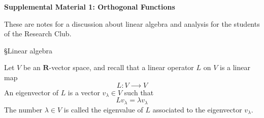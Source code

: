 %


\def\red#1{{\color{red}#1}}
\def\blue#1{{\color{blue}#1}}
\def\green#1{{\color{green}#1}}

\usepackage{placeins}

\def\gap{38mm}

\usepackage{amsthm} %
\theoremstyle{definition}
\newtheorem{definition}{Definition}
\theoremstyle{plain}
\newtheorem{proposition}{Proposition}
\newtheorem{lemma}{Lemma}
\newtheorem{theorem}{Theorem}
\newtheorem{corollary}{Corollary}
\newtheorem{conjecture}{Conjecture}
\newtheorem{example}{Example}
\newtheorem{result}{Result}
\newtheorem{claim}{Claim}
\newtheorem*{result*}{Result}
\newtheorem{exercise}{Exercise}
\newtheorem{problem}{Problem}




{\center
{\color{violet}\fontsize{28pt}{34pt}\bf\sffamily 
Supplemental Material 1: Orthogonal Functions
\\[.5in]
}

}
{\abstract
These are notes for a discussion about linear algebra and analysis for the students of the Research Club.
}






§{Linear algebra}

Let $V$ be an $𝐑$-vector space, and recall that a linear operator $L$ on $V$ is a linear map
$$
L:V ⟶ V
$$
An eigenvector of $L$ is a vector $v_λ ∈ V$ such that
$$
L v_λ = λ v_λ 
$$
The number $λ ∈ V$ is called the eigenvalue of $L$ associated to the eigenvector $v_λ$. 

